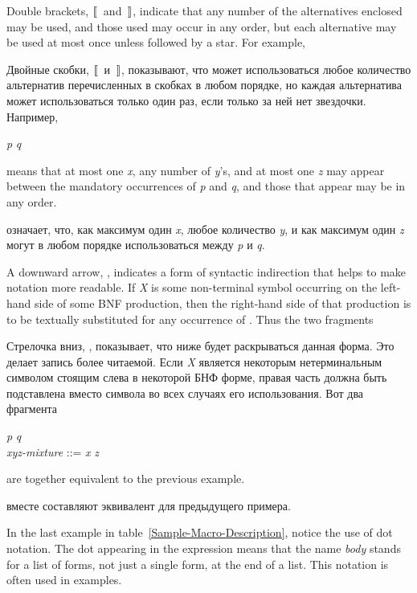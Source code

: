 \begin{newer}
Double brackets, $\dlbrack$ and $\drbrack$, indicate that any number of the
alternatives enclosed may be used, and those used
may occur in any order, but each
alternative may be used at most once unless followed by a star.
For example,

Двойные скобки, $\dlbrack$ и $\drbrack$, показывают, что может использоваться
любое количество альтернатив перечисленных в скобках в любом порядке, но каждая
альтернатива может использоваться только один раз, если только за ней нет
звездочки.
Например,
\begin{tabbing}
{\it p}  {\it q}
\end{tabbing}
means that
at most one {\it x}, any number of {\it y}'s, and at most one {\it z}
may appear between the mandatory occurrences of {\it p}
and {\it q}, and those that appear may be in any order.

означает, что, как максимум один {\it x}, любое количество {\it y}, и как максимум
один {\it z} могут в любом порядке использоваться между {\it p} и {\it q}.

A downward arrow, \Mind{}, indicates a form of syntactic indirection
that helps to make \Mchoice{~} notation more readable.  If {\it X} is
some non-terminal symbol occurring on the left-hand side of some BNF
production, then the right-hand
side of that production is to be textually substituted for any occurrence
of .  Thus the two fragments

Стрелочка вниз, \Mind{}, показывает, что ниже будет раскрываться данная
форма. Это делает запись \Mchoice{~} более читаемой. Если {\it X} является
некоторым нетерминальным символом стоящим слева в некоторой БНФ форме, правая
часть должна быть подставлена вместо символа  во всех случаях его
использования. Вот два фрагмента

\begin{tabbing}
{\it p}  {\it q} \\
{\it xyz-mixture} ::= {\it x\/} {\Mor}  {\Mor} {\it z\/}
\end{tabbing}
are together equivalent to the previous example.

вместе составляют эквивалент для предыдущего примера.
\end{newer}

In the last example in table~\ref{Sample-Macro-Description}, notice the
use of dot notation.  The dot appearing in the expression
 means that the name {\it body} stands
for a list of forms, not just a single form, at the end of a list.  This
notation is often used in examples.

